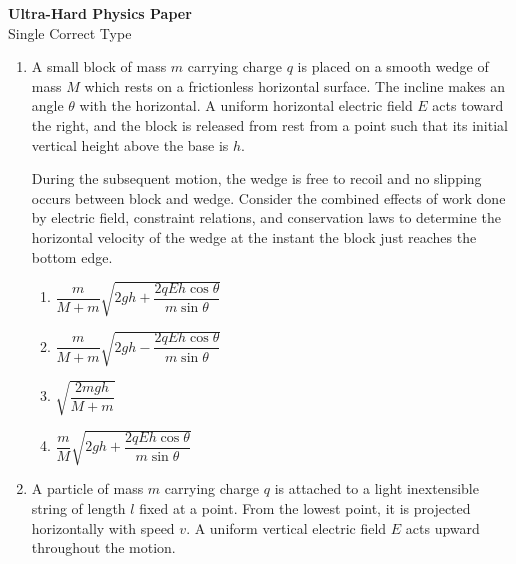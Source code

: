 \documentclass[12pt]{article}
\begin{document}
\begin{center}
{\Large \textbf{Ultra-Hard Physics Paper}}\\[4pt]
Single Correct Type
\end{center}

\begin{enumerate}

\item
A small block of mass $m$ carrying charge $q$ is placed on a smooth wedge of mass $M$ which rests on a frictionless horizontal surface. The incline makes an angle $\theta$ with the horizontal. A uniform horizontal electric field $E$ acts toward the right, and the block is released from rest from a point such that its initial vertical height above the base is $h$.

During the subsequent motion, the wedge is free to recoil and no slipping occurs between block and wedge. Consider the combined effects of work done by electric field, constraint relations, and conservation laws to determine the horizontal velocity of the wedge at the instant the block just reaches the bottom edge.


\begin{enumerate}
\item $\dfrac{m}{M+m}\sqrt{2gh+\dfrac{2qEh\cos\theta}{m\sin\theta}}$
\item $\dfrac{m}{M+m}\sqrt{2gh-\dfrac{2qEh\cos\theta}{m\sin\theta}}$
\item $\sqrt{\dfrac{2mgh}{M+m}}$
\item $\dfrac{m}{M}\sqrt{2gh+\dfrac{2qEh\cos\theta}{m\sin\theta}}$
\end{enumerate}

\item
A particle of mass $m$ carrying charge $q$ is attached to a light inextensible string of length $l$ fixed at a point. From the lowest point, it is projected horizontally with speed $v$. A uniform vertical electric field $E$ acts upward throughout the motion.


\end{enumerate}
\end{document}
